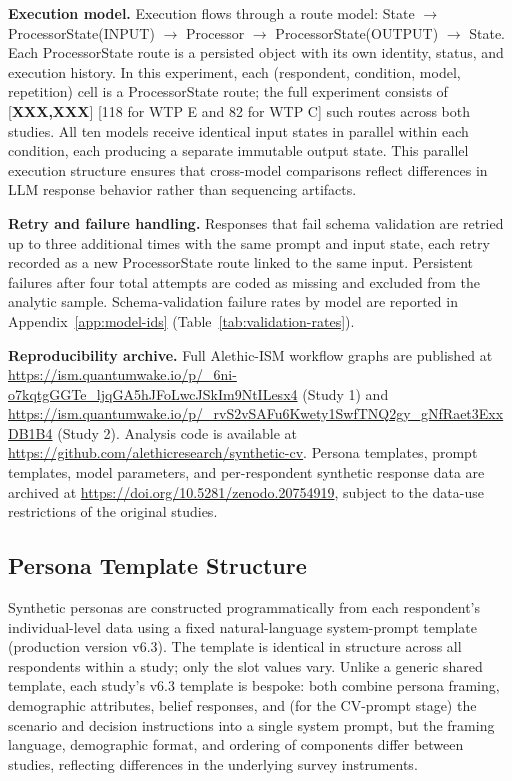 \documentclass[12pt]{article}
\begin{document}
\medskip\noindent\textbf{Execution model.} Execution flows through a route model: State $\rightarrow$ ProcessorState(INPUT) $\rightarrow$ Processor $\rightarrow$ ProcessorState(OUTPUT) $\rightarrow$ State. Each ProcessorState route is a persisted object with its own identity, status, and execution history. In this experiment, each (respondent, condition, model, repetition) cell is a ProcessorState route; the full experiment consists of [\textbf{XXX,XXX}] [118 for WTP E and 82 for WTP C] such routes across both studies. All ten models receive identical input states in parallel within each condition, each producing a separate immutable output state. This parallel execution structure ensures that cross-model comparisons reflect differences in LLM response behavior rather than sequencing artifacts.

\medskip\noindent\textbf{Retry and failure handling.} Responses that fail schema validation are retried up to three additional times with the same prompt and input state, each retry recorded as a new ProcessorState route linked to the same input. Persistent failures after four total attempts are coded as missing and excluded from the analytic sample. Schema-validation failure rates by model are reported in Appendix~\ref{app:model-ids} (Table~\ref{tab:validation-rates}).

\medskip\noindent\textbf{Reproducibility archive.} Full Alethic-ISM workflow graphs are published at \url{https://ism.quantumwake.io/p/_6ni-o7kqtgGGTe_ljqGA5hJFoLwcJSkIm9NtILesx4} (Study 1) and \url{https://ism.quantumwake.io/p/_rvS2vSAFu6Kwety1SwfTNQ2gy_gNfRaet3ExxDB1B4} (Study 2). Analysis code is available at \url{https://github.com/alethicresearch/synthetic-cv}. Persona templates, prompt templates, model parameters, and per-respondent synthetic response data are archived at \url{https://doi.org/10.5281/zenodo.20754919}, subject to the data-use restrictions of the original studies.

\subsection{Persona Template Structure}\label{app:platform-persona}

Synthetic personas are constructed programmatically from each respondent's individual-level data using a fixed natural-language system-prompt template (production version v6.3). The template is identical in structure across all respondents within a study; only the slot values vary. Unlike a generic shared template, each study's v6.3 template is bespoke: both combine persona framing, demographic attributes, belief responses, and (for the CV-prompt stage) the scenario and decision instructions into a single system prompt, but the framing language, demographic format, and ordering of components differ between studies, reflecting differences in the underlying survey instruments.
\end{document}
